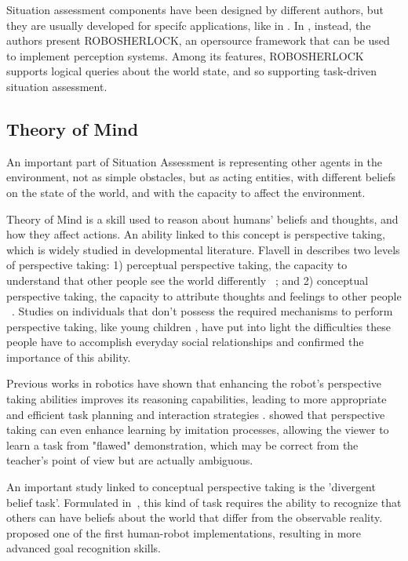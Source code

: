 Situation assessment components have been designed by different authors, but they are usually developed for specifc applications, like in \cite{Chella2010,Kluge01situationassessment}. In \cite{beetz2015robosherlock}, instead, the authors present ROBOSHERLOCK, an opersource framework that can be used to implement perception systems. Among its features, ROBOSHERLOCK supports logical queries about the world state, and so supporting task-driven situation assessment. 

\subsection{Theory of Mind}
An important part of Situation Assessment is representing other agents in the environment, not as simple obstacles, but as acting entities, with different beliefs on the state of the world, and with the capacity to affect the environment. 

Theory of Mind \cite{premack1978does} is a skill used to reason about humans' beliefs and thoughts, and how they affect actions. An ability linked to this concept is perspective taking, which is widely studied in developmental literature.  Flavell in \cite{flavell1977development} describes two levels of perspective taking: 
1) perceptual perspective taking,  the capacity to understand that other people see the world differently ~\cite{Tversky1999}; and 2) conceptual perspective taking, the capacity to attribute thoughts and feelings to other people ~\cite{Baron1985}. Studies on individuals that don't possess the required mechanisms to perform perspective taking, like young children \cite{frick2014picturing}, have put into light the difficulties these people have to accomplish everyday social relationships and confirmed the importance of this ability.

Previous works in robotics have shown that enhancing the robot's perspective taking abilities improves its reasoning capabilities, leading to more appropriate and efficient task planning and interaction strategies \cite{Trafton2005,ros2010one}. \cite{breazeal2006} showed that perspective taking can even enhance learning by imitation processes, allowing the viewer to learn a task from "flawed" demonstration, which may be correct from the teacher's point of view but are actually ambiguous. 

An important study linked to conceptual perspective taking is the 'divergent belief task'.  Formulated in~\cite{wimmer1983}, this kind of task requires the ability to recognize that others can have beliefs about the world that differ from the observable reality. ~\cite{BreazealGB09} proposed one of the first human-robot implementations, resulting in more advanced goal recognition skills. 

